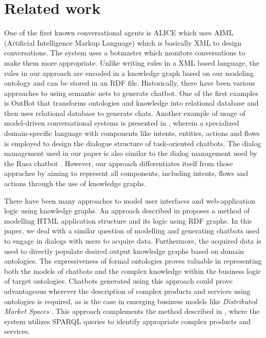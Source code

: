 \documentclass[runningheads]{llncs}
\begin{document}
\section{Related work}
One of the first known conversational agents is ALICE \cite{wallace2009anatomy} which uses AIML (Artificial Intelligence Markup Language) which is basically XML to design conversations. The system uses a botmaster which monitors conversations to make them more appropriate. Unlike writing rules in a XML based language, the rules in our approach are encoded in a knowledge graph based on our modeling ontology and can be stored in an RDF file. Historically, there have been various approaches to using semantic nets to generate chatbot. One of the first examples is OntBot \cite{al2011ontbot} that transforms ontologies and knowledge into relational database and then uses relational database to generate chats. Another example of usage of model-driven conversational systems is presented in \cite{perez2020model}, wherein a specialized domain-specific language with components like intents, entities, actions and flows is employed to design the dialogue structure of task-oriented chatbots. The dialog management used in our paper is also similar to the dialog management used by the Rasa chatbot \cite{bocklisch2017rasa}. However, our approach differentiates itself from those appraches by aiming to represent all components, including intents, flows and actions through the use of knowledge graphs. 

There have been many approaches to model user interfaces and web-application logic using knowledge graphs. An approach described in \cite{rutesic2021enhanced} proposes a method of modelling HTML application structure and its logic using RDF graphs.
In this paper, we deal with a similar question of modelling and generating chatbots used to engage in dialogs with users to acquire data. Furthermore, the acquired data is used to directly populate desired output knowledge graphs based on domain ontologies. The expressiveness of formal ontologies proves valuable in representing both the models of chatbots and the complex knowledge within the business logic of target ontologies.
Chatbots generated using this approach could prove advantageous wherever the description of complex products and services using ontologies is required, as is the case in emerging business models like {\itshape Distributed Market Spaces} \cite{radonjic2020arising}. This approach complements the method described in \cite{hitz2016generic}, where the system utilizes SPARQL queries to identify appropriate complex products and services.  
\end{document}
